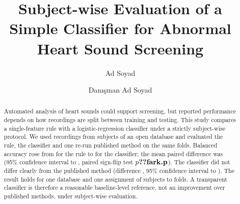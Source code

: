 \documentclass[preprint,12pt]{elsarticle}   %
\begin{document}
\begin{frontmatter}   %

\title{Subject-wise Evaluation of a Simple Classifier for Abnormal Heart Sound Screening}

\author[kku]{Ad Soyad}
\author[kku]{Danışman Ad Soyad}

\begin{abstract}
Automated analysis of heart sounds could support screening, but reported performance depends
on how recordings are split between training and testing. This study compares a
single-feature rule with a logistic-regression classifier under a strictly subject-wise
protocol. We used  recordings from  subjects of an open
database and evaluated the rule, the classifier and one re-run published method on the same
 folds. Balanced accuracy rose from  for the rule to 
for the classifier; the mean paired difference was  (95\% confidence interval
 to , paired sign-flip test $p \sonuc{fark.p}$). The classifier
did not differ clearly from the published method (difference , 95\% confidence
interval  to ). The result holds for one database and one
assignment of subjects to folds. A transparent classifier is therefore a reasonable
baseline-level reference, not an improvement over published methods, under subject-wise evaluation.
\end{abstract}


\end{frontmatter}
\end{document}
